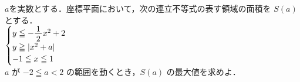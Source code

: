 ﻿\documentclass[../../../uem_tok_q.tex]{subfiles}
\begin{document}
    $a$を実数とする．座標平面において，次の連立不等式の表す領域の面積を $S(a)$ とする．\\
    \hspace{3\zw}%
    $\displaystyle%
        \begin{cases}
            y \leqq -\myfraca{1}{2}x^2+2 \\
            y \geqq |x^2+a| \\
            -1 \leqq x \leqq 1
        \end{cases}%
    $\\
    $a$ が $-2\leqq a<2$ の範囲を動くとき，$S(a)$ の最大値を求めよ．
\end{document}
